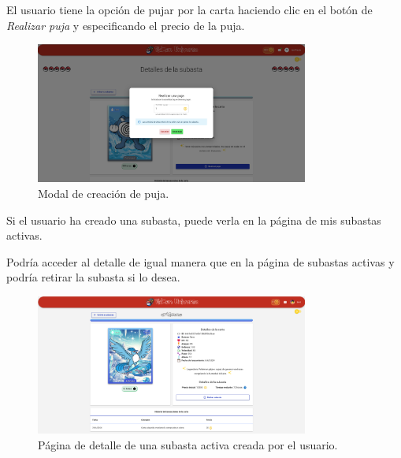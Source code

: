 El usuario tiene la opción de pujar por la carta haciendo clic en el botón de \textit{Realizar puja} y especificando el precio de la puja.
\begin{figure}[H]
    \centering
    \includegraphics[width=0.8\textwidth]{figures/6-Analisis/6-Interfaz/interfaz/crear-puja.png}
    \caption{Modal de creación de puja.}
    \label{fig:m-interfaz-puja}
\end{figure}


Si el usuario ha creado una subasta, puede verla en la página de mis subastas activas.


Podría acceder al detalle de igual manera que en la página de subastas activas
y podría retirar la subasta si lo desea.

\begin{figure}[H]
    \centering
    \includegraphics[width=0.8\textwidth]{figures/6-Analisis/6-Interfaz/interfaz/mi_subasta_detalle.png}
    \caption{Página de detalle de una subasta activa creada por el usuario.}
    \label{fig:m-interfaz-detalle-mi-subasta1}
\end{figure}


